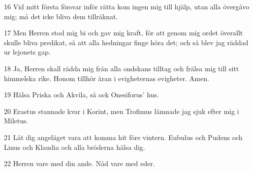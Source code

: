 \par 16 Vid mitt första försvar inför rätta kom ingen mig till hjälp, utan alla övergåvo mig; må det icke bliva dem tillräknat.
\par 17 Men Herren stod mig bi och gav mig kraft, för att genom mig ordet överallt skulle bliva predikat, så att alla hedningar finge höra det; och så blev jag räddad ur lejonets gap.
\par 18 Ja, Herren skall rädda mig från alla ondskans tilltag och frälsa mig till sitt himmelska rike. Honom tillhör äran i evigheternas evigheter. Amen.
\par 19 Hälsa Priska och Akvila, så ock Onesiforus' hus.
\par 20 Erastus stannade kvar i Korint, men Trofimus lämnade jag sjuk efter mig i Miletus.
\par 21 Låt dig angeläget vara att komma hit före vintern. Eubulus och Pudens och Linus och Klaudia och alla bröderna hälsa dig.
\par 22 Herren vare med din ande. Nåd vare med eder.


